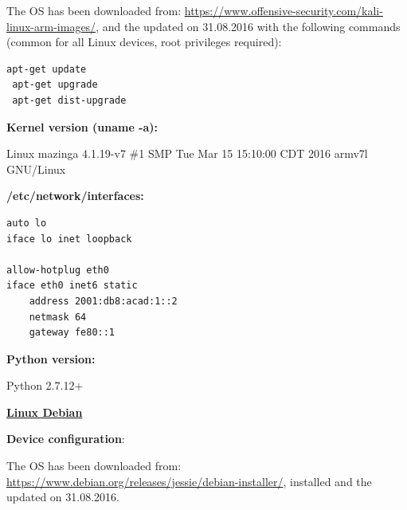 \documentclass[12pt]{article}
\begin{document}
The OS has been downloaded from: \url{https://www.offensive-security.com/kali-linux-arm-images/}, and the updated on 31.08.2016 with the following commands (common for all Linux devices, root privileges required):
\begin{lstlisting}[style=python,basicstyle=\ttfamily\scriptsize]
 apt-get update
 apt-get upgrade
 apt-get dist-upgrade
\end{lstlisting}

\vspace{-10pt}
\textbf{Kernel version (uname -a):}

\vspace{-15pt}
Linux mazinga 4.1.19-v7 \#1 SMP Tue Mar 15 15:10:00 CDT 2016 armv7l GNU/Linux


\textbf{/etc/network/interfaces:}

\vspace{-5pt}
\begin{lstlisting}[style=python,basicstyle=\ttfamily\scriptsize]
auto lo
iface lo inet loopback

allow-hotplug eth0
iface eth0 inet6 static
	address 2001:db8:acad:1::2
	netmask 64
	gateway fe80::1
\end{lstlisting}

\textbf{Python version:} 

\vspace{-15pt}
Python 2.7.12+

\textbf{\underline{Linux Debian}}

\vspace{-10pt}
\textbf{Device configuration}:

\begin{savenotes}
\begin{table}[!htpb]
\centering
\addtolength{\tabcolsep}{1pt}
\noindent{}
\caption{Linux Debian}
\label{table:linuxDeb}
\end{table}
\end{savenotes}

The OS has been downloaded from: \url{https://www.debian.org/releases/jessie/debian-installer/}, installed and the updated on 31.08.2016.
\end{document}
